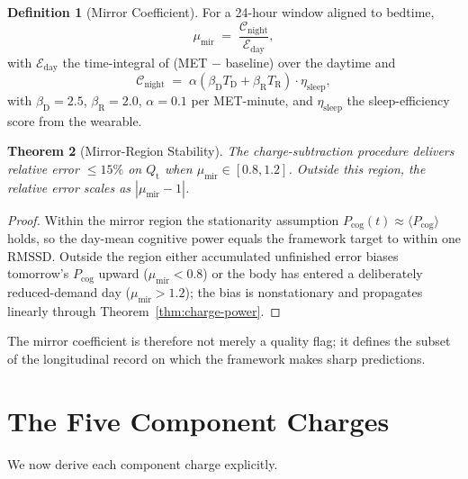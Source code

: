 \documentclass[11pt,twocolumn,a4paper]{article}
\newtheorem{theorem}{Theorem}[section]
\theoremstyle{definition}
\newtheorem{definition}[theorem]{Definition}
\theoremstyle{remark}
\newcommand{\Qt}{Q_{\mathrm{t}}}
\newcommand{\Pcog}{P_{\mathrm{cog}}}
\newcommand{\RMSSD}{\mathrm{RMSSD}}
\newcommand{\munir}{\mu_{\mathrm{mir}}}
\begin{document}
\begin{definition}[Mirror Coefficient]
\label{def:mu}
For a 24-hour window aligned to bedtime,
\begin{equation}
\munir \;=\; \frac{\mathcal{C}_{\mathrm{night}}}{\mathcal{E}_{\mathrm{day}}},
\end{equation}
with $\mathcal{E}_{\mathrm{day}}$ the time-integral of (MET $-$
baseline) over the daytime and
\begin{equation}
\mathcal{C}_{\mathrm{night}} \;=\; \alpha \left(\beta_{\mathrm{D}} T_{\mathrm{D}}
+ \beta_{\mathrm{R}} T_{\mathrm{R}}\right) \cdot \eta_{\mathrm{sleep}},
\end{equation}
with $\beta_{\mathrm{D}} = 2.5$, $\beta_{\mathrm{R}} = 2.0$, $\alpha
= 0.1$ per MET-minute, and $\eta_{\mathrm{sleep}}$ the
sleep-efficiency score from the wearable.
\end{definition}

\begin{theorem}[Mirror-Region Stability]
\label{thm:mirror}
The charge-subtraction procedure delivers relative error $\leq 15\%$
on $\Qt$ when $\munir \in [0.8, 1.2]$. Outside this region, the
relative error scales as $|\munir - 1|$.
\end{theorem}

\begin{proof}
Within the mirror region the stationarity assumption $\Pcog(t)
\approx \langle\Pcog\rangle$ holds, so the day-mean cognitive power
equals the framework target to within one $\RMSSD$. Outside the
region either accumulated unfinished error biases tomorrow's
$\Pcog$ upward ($\munir < 0.8$) or the body has entered a
deliberately reduced-demand day ($\munir > 1.2$); the bias is
nonstationary and propagates linearly through Theorem~\ref{thm:charge-power}.
\end{proof}

The mirror coefficient is therefore not merely a quality flag; it
defines the subset of the longitudinal record on which the framework
makes sharp predictions.

\section{The Five Component Charges}
\label{sec:five-charges}

We now derive each component charge explicitly.
\end{document}
